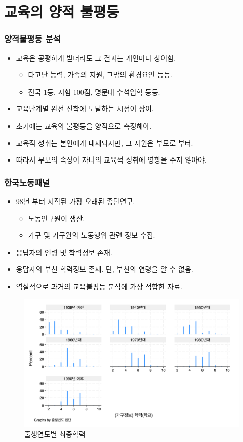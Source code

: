 \documentclass[aspectratio=169,xcolor=dvipsnames,handout]{beamer}
\begin{document}
\section{교육의 양적 불평등}
\begin{frame}[<+->]
\frametitle{양적불평등 분석}
    \begin{itemize}[<+->]
        \item 교육은 공평하게 받더라도 그 결과는 개인마다 상이함.
        \begin{itemize}[<+->]
            \item 타고난 능력, 가족의 지원, 그밖의 환경요인 등등.
            \item 전국 1등, 시험 100점, 명문대 수석입학 등등.
        \end{itemize}
        \item 교육단계별 완전 진학에 도달하는 시점이 상이.
        \item 초기에는 교육의 불평등을 양적으로 측정해야. 
        \item 교육적 성취는 본인에게 내재되지만, 그 자원은 부모로 부터.
        \item 따라서 부모의 속성이 자녀의 교육적 성취에 영향을 주지 않아야.
    \end{itemize}
\end{frame}

\begin{frame}[<+->]
\frametitle{한국노동패널}
    \begin{itemize}[<+->]
        \item 98년 부터 시작된 가장 오래된 종단연구.
        \begin{itemize}[<+->]
            \item 노동연구원이 생산.
            \item 가구 및 가구원의 노동행위 관련 정보 수집.
        \end{itemize}
        \item 응답자의 연령 및 학력정보 존재.
        \item 응답자의 부친 학력정보 존재. 단, 부친의 연령을 알 수 없음.
        \item 역설적으로 과거의 교육불평등 분석에 가장 적합한 자료.
    \end{itemize}
\end{frame}

\begin{frame}[<+->]
    \begin{figure}
        \centering
        \includegraphics[width=.70\textwidth]{pic/eduk1.png}
        \caption{출생연도별 최종학력}
    \end{figure}
\end{frame}
\end{document}
